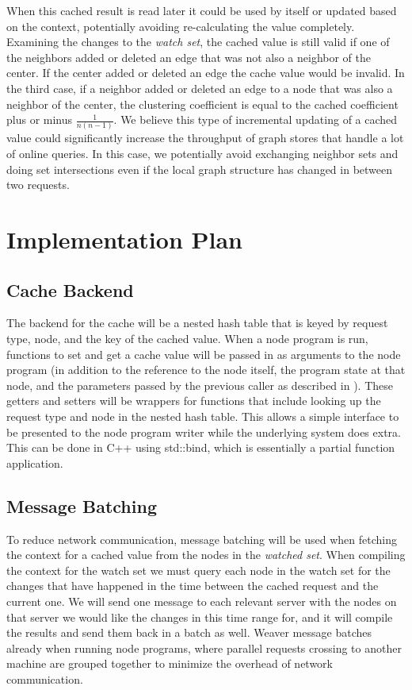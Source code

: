 \documentclass[letterpaper,twocolumn,11pt,tight]{article}
\begin{document}
    When this cached result is read later it could be used by itself or updated based on the context, potentially avoiding re-calculating the value completely. Examining the changes to the \emph{watch set}, the cached value is still valid if one of the neighbors added or deleted an edge that was not also a neighbor of the center. If the center added or deleted an edge the cache value would be invalid. In the third case, if a neighbor added or deleted an edge to a node that was also a neighbor of the center, the clustering coefficient is equal to the cached coefficient plus or minus $\frac1{n(n-1)}$. 
We believe this type of incremental updating of a cached value could significantly increase the throughput of graph stores that handle a lot of online queries. In this case, we potentially avoid exchanging neighbor sets and doing set intersections even if the local graph structure has changed in between two requests.

\section{Implementation Plan}\label{sec:design}
\subsection{Cache Backend}
The backend for the cache will be a nested hash table that is keyed by request type, node, and the key of the cached value. When a node program is run, functions to set and get a cache value will be passed in as arguments to the node program (in addition to the reference to the node itself, the program state at that node, and the parameters passed by the previous caller as described in ). These getters and setters will be wrappers for functions that include looking up the request type and node in the nested hash table. This allows a simple interface to be presented to the node program writer while the underlying system does extra. This can be done in C++ using std::bind, which is essentially a partial function application.
\subsection{Message Batching}
To reduce network communication, message batching will be used when fetching the context for a cached value from the nodes in the \emph{watched set}.
When compiling the context for the watch set we must query each node in the watch set for the changes that have happened in the time between the cached request and the current one. We will send one message to each relevant server with the nodes on that server we would like the changes in this time range for, and it will compile the results and send them back in a batch as well. Weaver message batches already when running node programs, where parallel requests crossing to another machine are grouped together to minimize the overhead of network communication.
\end{document}
